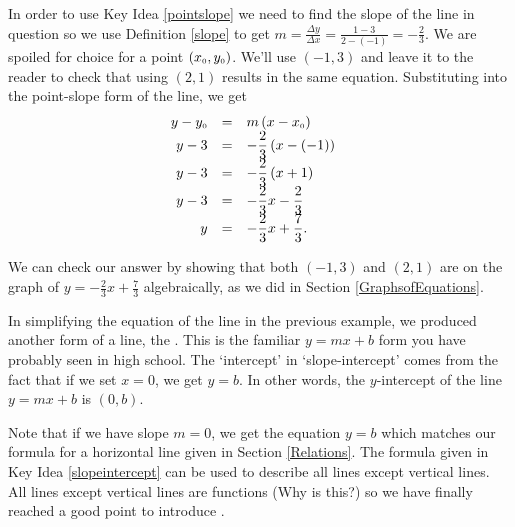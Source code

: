 {
In order to use Key Idea \ref{pointslope} we need to find the slope of the line in question so we use Definition \ref{slope} to get $m = \frac{\Delta y}{\Delta x} = \frac{1 - 3}{2 - (-1)} = -\frac{2}{3}$.  We are spoiled for choice for a point $\left(x_{\mbox{\tiny$0$}}, y_{\mbox{\tiny$0$}}\right)$. We'll use $(-1,3)$ and leave it to the reader to check that using $(2,1)$ results in the same equation.  Substituting into the point-slope form of the line, we get 
\setlength{\extrarowheight}{10pt}
\[\begin{array}{rclr} 
y - y_{\mbox{\tiny$0$}} & = & m\left(x - x_{\mbox{\tiny$0$}}\right)  & \\
y - 3 & = & -\dfrac{2}{3} \left(x - (-1)\right) & \\
y - 3 & = & -\dfrac{2}{3} \left(x +1 \right) & \\
y - 3& = & -\dfrac{2}{3}x - \dfrac{2}{3}\\
y & = & -\dfrac{2}{3} x + \dfrac{7}{3}. \\ 
\end{array} \]

\setlength{\extrarowheight}{2pt}

We can check our answer by showing that both $(-1,3)$ and $(2,1)$ are on the graph of $y  =  -\frac{2}{3} x + \frac{7}{3}$ algebraically, as we did in Section \ref{GraphsofEquations}.
}

In simplifying the equation of the line in the previous example, we produced another form of a line, the .  This is the familiar $y = mx + b$ form you have probably seen in high school. The `intercept' in `slope-intercept' comes from the fact that if we set $x=0$, we get $y = b$.  In other words, the $y$-intercept of the line $y = mx + b$ is $(0,b)$.

\smallskip


\smallskip

Note that if we have slope $m = 0$, we get the equation $y = b$ which matches our formula for a horizontal line given in Section \ref{Relations}.  The formula given in Key Idea \ref{slopeintercept} can be used to describe all lines except vertical lines.  All lines except vertical lines are functions (Why is this?) so we have finally reached a good point to introduce .

